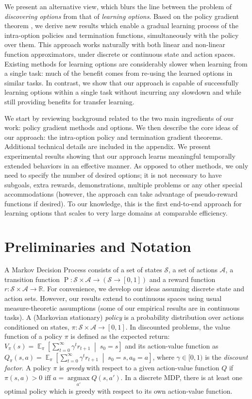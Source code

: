 \documentclass[letterpaper]{article}
\def\given{\;\middle\vert\;}
\DeclareMathOperator*{\expectation}{\mathbb{E}}
\DeclareMathOperator{\prob}{P}
\DeclareMathOperator{\argmax}{argmax}
\begin{document}
We present an alternative view, which blurs the line between
the problem of {\em discovering options} from that of {\em learning options}.
Based on the policy gradient theorem \cite{Sutton1999pg}, we derive new results
which enable a gradual learning process of the intra-option policies and
termination functions, simultaneously with the policy over them. This approach
works naturally with both linear and non-linear function
approximators, under discrete or continuous state and action spaces. Existing
methods for learning options are considerably slower when learning from a
single task: much of the benefit comes from re-using
the learned options in similar tasks. In contrast, we show that our approach
is capable of successfully learning options within a single task
without incurring any slowdown and while still providing benefits for transfer learning.

We start by reviewing background related to the two main ingredients of our work: policy gradient methods and options.
We then describe the core ideas of our approach: the intra-option policy
and termination gradient theorems. Additional technical details are included in
the appendix. We present experimental results
showing that our approach learns meaningful temporally extended
behaviors in an effective manner. As opposed
to other methods, we only need to specify the number of desired
options; it is not necessary to have subgoals, extra rewards, demonstrations,
multiple problems or any other special accommodations (however, the approach can
take advantage of pseudo-reward functions if desired).
To our knowledge, this is the first end-to-end approach for learning options
that scales to very large domains at comparable efficiency.
 \section{Preliminaries and Notation} \label{sect:prelim}

A Markov Decision Process consists of a set of states $\mathcal{S}$,
a set of actions $\mathcal{A}$, a transition function
$\prob : \mathcal{S} \times \mathcal{A} \to (\mathcal{S} \to [0,1])$
and a reward function $r: \mathcal{S} \times \mathcal{A} \to \mathbb{R}$.
For convenience, we develop our ideas assuming discrete state and action sets.
However, our results extend to continuous spaces using usual measure-theoretic assumptions
(some of our empirical results are in continuous tasks).
A (Markovian stationary) \textit{policy}  is a probability
distribution over actions conditioned on states, $\pi: \mathcal{S} \times \mathcal{A} \to [0,1]$.
In discounted problems, the
value function of a policy $\pi$ is defined as the expected return:
$V_\pi(s) = \expectation_{\pi}\left[ \sum_{t=0}^\infty \gamma^{t} r_{t+1} \given s_0=s \right]$
and its action-value function as $Q_\pi(s, a) = \expectation_{\pi}\left[ \sum_{t=0}^\infty \gamma^{t} r_{t+1} \given s_0=s, a_0 = a \right]$,
where $\gamma \in [0, 1)$ is the \textit{discount factor}. A policy $\pi$ is
 \textit{greedy} with respect to a given action-value function $Q$ if $\pi(s,a)>0 \mbox{ iff } a=\argmax\limits_{a'} Q(s, a')$.
In a discrete MDP, there is at least one optimal policy which is greedy with
respect to its own action-value function.
\end{document}
